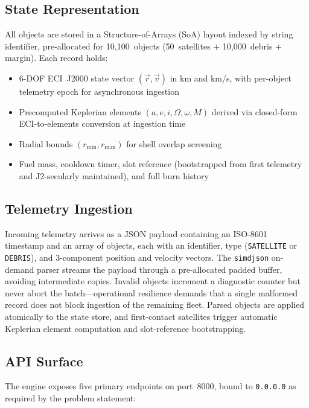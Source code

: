\documentclass[10pt,twocolumn,letterpaper]{article}
\begin{document}
\subsection{State Representation}

All objects are stored in a Structure-of-Arrays (SoA) layout indexed by
string identifier, pre-allocated for 10{,}100~objects (50~satellites +
10{,}000~debris + margin).  Each record holds:

\begin{itemize}[nosep,leftmargin=*]
  \item 6-DOF ECI~J2000 state vector $(\vec{r}, \vec{v})$ in km and km/s,
    with per-object telemetry epoch for asynchronous ingestion
  \item Precomputed Keplerian elements $(a, e, i, \Omega, \omega, M)$
    derived via closed-form ECI-to-elements conversion at ingestion time
  \item Radial bounds $(r_{\min}, r_{\max})$ for shell overlap screening
  \item Fuel mass, cooldown timer, slot reference (bootstrapped from first
    telemetry and J2-secularly maintained), and full burn history
\end{itemize}

\subsection{Telemetry Ingestion}

Incoming telemetry arrives as a JSON payload containing an ISO-8601
timestamp and an array of objects, each with an identifier, type
(\texttt{SATELLITE} or \texttt{DEBRIS}), and 3-component position and
velocity vectors.  The \texttt{simdjson} on-demand parser streams the
payload through a pre-allocated padded buffer, avoiding intermediate
copies.  Invalid objects increment a diagnostic counter but never abort
the batch---operational resilience demands that a single malformed record
does not block ingestion of the remaining fleet.  Parsed objects are
applied atomically to the state store, and first-contact satellites
trigger automatic Keplerian element computation and slot-reference
bootstrapping.

\subsection{API Surface}

The engine exposes five primary endpoints on port~8000, bound to
\texttt{0.0.0.0} as required by the problem statement:
\end{document}
